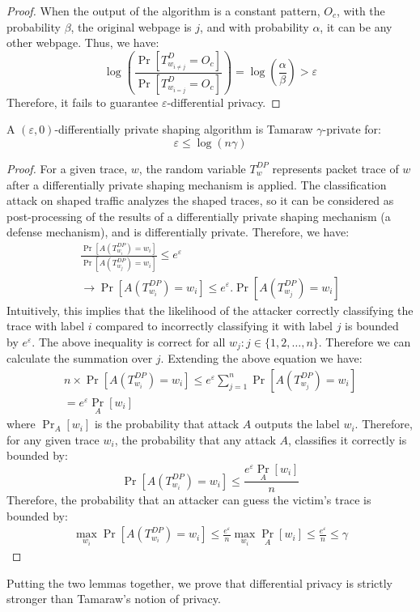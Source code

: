 \begin{proof}
    When the output of the algorithm is a constant pattern, $O_{c}$, with the probability $\beta$, the original webpage is $j$, and with probability $\alpha$, it can be any other webpage. Thus, we have:
    \begin{equation*}
    \log(\frac{\Pr[T_{w_{i\neq j}}^{D}=O_{c}]}{\Pr[T_{w_{i=j}}^{D}=O_{c}]})
    = \log(\frac{\alpha}{\beta}) > \varepsilon
    \end{equation*}
  Therefore, it fails to guarantee $\varepsilon$-differential privacy.
\end{proof}


\begin{lemma-numbered}
  A $(\varepsilon, 0)$-differentially private shaping algorithm is Tamaraw $\gamma$-private for:
  \begin{equation*}
    \varepsilon \leq \log(n\gamma)
  \end{equation*}
\end{lemma-numbered}
\begin{proof}
  For a given trace, $w$, the random variable $T_{w}^{DP}$ represents packet
  trace of $w$ after  a differentially private shaping mechanism is applied.
  The classification attack on shaped traffic analyzes the shaped traces, so it can be considered as post-processing of the results of a
  differentially private shaping mechanism (\ie a defense mechanism), and is differentially
  private. Therefore,
  we have:
  \begin{align*}
    \frac{\Pr[A(T_{w_{i}}^{DP}) = w_i]}{\Pr[A(T_{w_{j}}^{DP}) = w_i]} \leq e^
    {\varepsilon}
    \\
    \rightarrow \Pr[A(T_{w_{i}}^{DP}) = w_i] \leq e^
    {\varepsilon} .\Pr[A(T_{w_{j}}^{DP}) = w_i]
  \end{align*}
  Intuitively, this implies that the likelihood of the attacker correctly classifying the trace with label $i$ compared to incorrectly classifying it with label $j$ is bounded by $e^{\varepsilon}$.
  The above inequality is correct for all $w_j: j\in \{1, 2, \dots, n\}$. Therefore we can calculate the summation over $j$.
  Extending the above equation we have:
  \begin{align*}
    n\times \Pr[A(T_{w_{i}}^{DP}) = w_i] \leq e^{\varepsilon}\sum_{j=1}^{n} \Pr[A(T_{w_{j}}^{DP}) = w_i] \\
    = e^{\varepsilon} \operatorname{Pr}_{A}[w_i]
  \end{align*}
  where $\Pr_{A}[w_i]$ is the probability that attack $A$ outputs the label
  $w_i$.
  Therefore, for any given trace $w_i$, the probability that any attack $A$, classifies it correctly is bounded by:
  \begin{equation*}
    \Pr[A(T_{w_{i}}^{DP}) = w_i] \leq \frac{e^{\varepsilon} \Pr_{A}[w_i]}{n}
  \end{equation*}
  Therefore, the probability that an attacker can guess the victim’s trace is bounded by:
  \begin{align*}
    \max_{w_i}{\Pr[A(T_{w_{i}}^{DP}) = w_i]} \leq \frac{e^{\varepsilon}}{n} \max_{w_i}{\operatorname{Pr}_{A}[w_i]} \leq \frac{e^{\varepsilon}}{n} \leq \gamma
  \end{align*}
\end{proof}
\noindent
Putting the two lemmas together, we prove that differential
privacy is strictly stronger than Tamaraw's notion of privacy.
